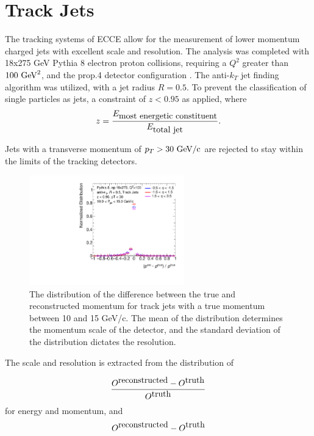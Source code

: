 \section {Track Jets}
\label{section2}

The tracking systems of ECCE allow for the measurement of lower momentum charged jets with excellent scale and resolution.  The analysis was completed with 18x275 GeV Pythia 8 electron proton collisions, requiring a $Q^2$ greater than $100 \hbox{ GeV}^2$, and the prop.4 detector configuration \cite{Prop.4:Config}.  The anti-$k_T$ jet finding algorithm was utilized, with a jet radius $R=0.5$.  To prevent the classification of single particles as jets, a constraint of $z<0.95$ as applied, where 
\begin{equation}
z=\frac{E_{\hbox{most energetic constituent}}}{E_{\hbox{total jet}}}.
\label{eq:jet_z}
\end{equation}

Jets with a transverse momentum of $p_T > 30\hbox{ GeV/c}$ are rejected to stay within the limits of the tracking detectors.

\begin{figure}[h]
    \centering
    \includegraphics[width=0.6\textwidth]{figs/Final_Plots/JES_Slice_Plot_EtaBins2_grouped.pdf}
    \caption{The distribution of the difference between the true and reconstructed momentum for track jets with a true momentum between 10 and 15 GeV/c.  The mean of the distribution determines the momentum scale of the detector, and the standard deviation of the distribution dictates the resolution.}
    \label{fig:track_momentum_slice}
\end{figure}

The scale and resolution is extracted from the distribution of 

\begin{equation}
    \frac{O^{\hbox{reconstructed}}-O^{\hbox{truth}}}{O^{\hbox{truth}}}
    \label{eq:distribution}
\end{equation}
for energy and momentum, and 
\begin{equation}
    O^{\hbox{reconstructed}}-O^{\hbox{truth}}
    \label{eq:distribution}
\end{equation}

